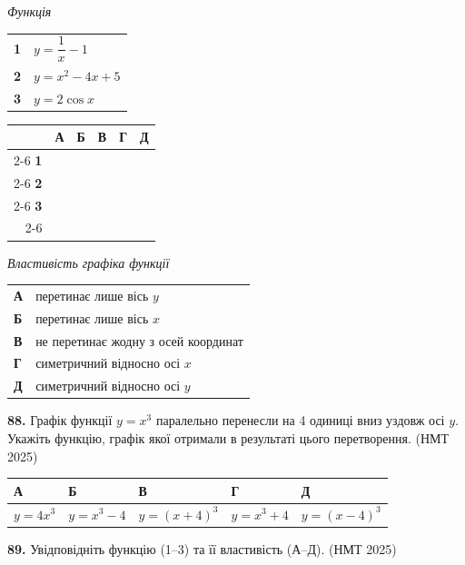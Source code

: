 \documentclass[14pt]{extarticle}
\newcommand{\answerTableTall}[5]{
\begin{center}
\begin{tabular}{|*{5}{>{\centering\arraybackslash}m{2.8cm}|}}
\hline
\rule[-0.3cm]{0pt}{0.8cm}\textbf{А} & \textbf{Б} & \textbf{В} & \textbf{Г} & \textbf{Д} \\
\hline
\rule[-0.9cm]{0pt}{2.0cm}#1 & 
\rule[-0.9cm]{0pt}{2.0cm}#2 & 
\rule[-0.9cm]{0pt}{2.0cm}#3 & 
\rule[-0.9cm]{0pt}{2.0cm}#4 & 
\rule[-0.9cm]{0pt}{2.0cm}#5 \\
\hline
\end{tabular}
\end{center}
}
\newcommand{\answerGrid}{
    \begingroup
    \renewcommand{\arraystretch}{1.3} 
    \setlength{\tabcolsep}{7pt} 
    \begin{tabular}{r|c|c|c|c|c|}
         \multicolumn{1}{c}{} & \multicolumn{1}{c}{\textbf{А}} & \multicolumn{1}{c}{\textbf{Б}} & \multicolumn{1}{c}{\textbf{В}} & \multicolumn{1}{c}{\textbf{Г}} & \multicolumn{1}{c}{\textbf{Д}} \\ \cline{2-6}
         \textbf{1} & & & & & \\ \cline{2-6}
         \textbf{2} & & & & & \\ \cline{2-6}
         \textbf{3} & & & & & \\ \cline{2-6}
    \end{tabular}
    \endgroup
}
\newcommand{\nmtyear}[1]{\hfill{\small\color{yearcolor}(НМТ #1)}}
\begin{document}
\noindent
\begin{minipage}[t]{0.45\textwidth}
    \textit{Функція} \par \vspace{0.2cm}
    \begin{tabular}{@{}p{0.5cm} l@{}}
    \textbf{1} & $y=\dfrac{1}{x}-1$ \\[0.4cm]
    \textbf{2} & $y=x^2-4x+5$ \\[0.4cm]
    \textbf{3} & $y=2\cos x$ \\
    \end{tabular}

    \vspace{1.0cm}
    \answerGrid
\end{minipage}%
\hfill
\begin{minipage}[t]{0.50\textwidth}
    \textit{Властивість графіка функції} \par \vspace{0.2cm}
    \begin{tabular}{@{}p{0.5cm} p{7cm}@{}}
    \textbf{А} & перетинає лише вісь $y$ \\[0.2cm]
    \textbf{Б} & перетинає лише вісь $x$ \\[0.2cm]
    \textbf{В} & не перетинає жодну з осей координат \\[0.2cm]
    \textbf{Г} & симетричний відносно осі $x$ \\[0.2cm]
    \textbf{Д} & симетричний відносно осі $y$ \\
    \end{tabular}
\end{minipage}

\vspace{0.7cm}

\noindent\textbf{88.} Графік функції $y=x^3$ паралельно перенесли на 4 одиниці вниз уздовж осі $y$. Укажіть функцію, графік якої отримали в результаті цього перетворення. \nmtyear{2025}

\vspace{0.3cm}
\answerTableTall{$y=4x^3$}{$y=x^3-4$}{$y=(x+4)^3$}{$y=x^3+4$}{$y=(x-4)^3$}

\vspace{0.7cm}

\noindent\textbf{89.} Увідповідніть функцію (1--3) та її властивість (А--Д). \nmtyear{2025}

\vspace{0.3cm}
\end{document}
